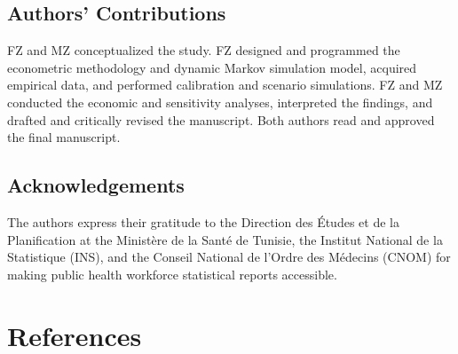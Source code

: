 \documentclass[
  11pt,
  a4paper]{article}
\begin{document}
\subsection{Authors' Contributions}\label{authors-contributions}

FZ and MZ conceptualized the study. FZ designed and programmed the
econometric methodology and dynamic Markov simulation model, acquired
empirical data, and performed calibration and scenario simulations. FZ
and MZ conducted the economic and sensitivity analyses, interpreted the
findings, and drafted and critically revised the manuscript. Both
authors read and approved the final manuscript.

\subsection{Acknowledgements}\label{acknowledgements}

The authors express their gratitude to the Direction des Études et de la
Planification at the Ministère de la Santé de Tunisie, the Institut
National de la Statistique (INS), and the Conseil National de l'Ordre
des Médecins (CNOM) for making public health workforce statistical
reports accessible.

\section*{References}\label{references}
\end{document}
